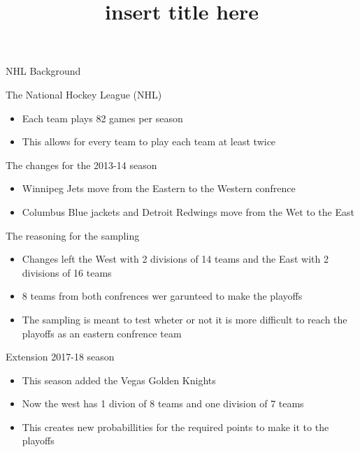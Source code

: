 \documentclass[
  ignorenonframetext,
]{beamer}
\title{insert title here}
\date{}
\providecommand{\tightlist}{%
  \setlength{\itemsep}{0pt}\setlength{\parskip}{0pt}}
\begin{document}
\frame{\titlepage}

\begin{frame}{NHL Background}
\protect\hypertarget{nhl-background}{}

\begin{block}{The National Hockey League (NHL)}

\begin{itemize}
\tightlist
\item
  Each team plays 82 games per season
\item
  This allows for every team to play each team at least twice
\end{itemize}

\end{block}

\begin{block}{The changes for the 2013-14 season}

\begin{itemize}
\tightlist
\item
  Winnipeg Jets move from the Eastern to the Western confrence
\item
  Columbus Blue jackets and Detroit Redwings move from the Wet to the
  East\\
\end{itemize}

\end{block}

\begin{block}{The reasoning for the sampling}

\begin{itemize}
\tightlist
\item
  Changes left the West with 2 divisions of 14 teams and the East with 2
  divisions of 16 teams
\item
  8 teams from both confrences wer garunteed to make the playoffs
\item
  The sampling is meant to test wheter or not it is more difficult to
  reach the playoffs as an eastern confrence team
\end{itemize}

\end{block}

\end{frame}

\begin{frame}{Extension 2017-18 season}
\protect\hypertarget{extension-2017-18-season}{}

\begin{itemize}
\tightlist
\item
  This season added the Vegas Golden Knights
\item
  Now the west has 1 divion of 8 teams and one division of 7 teams
\item
  This creates new probabillities for the required points to make it to
  the playoffs
\end{itemize}

\end{frame}
\end{document}
